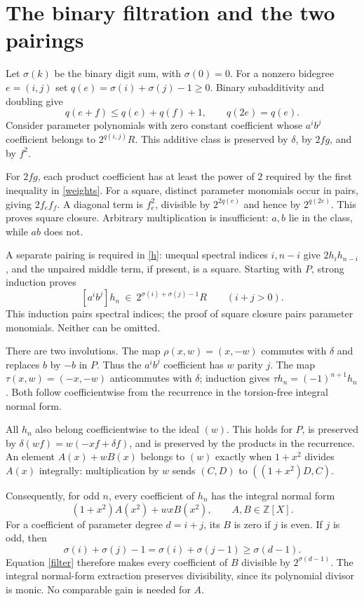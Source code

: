 \documentclass[11pt]{article}
\newcommand{\Z}{\mathbb Z}\newcommand{\Q}{\mathbb Q}
\newcommand{\sig}{\sigma}
\newcommand{\coef}[1]{\left[#1\right]}
\begin{document}
\newpage
\section{The binary filtration and the two pairings}
Let $\sig(k)$ be the binary digit sum, with $\sig(0)=0$. For a nonzero bidegree $e=(i,j)$ set $q(e)=\sig(i)+\sig(j)-1\ge0$. Binary subadditivity and doubling give
\begin{equation}\label{weights}
 q(e+f)\le q(e)+q(f)+1,\qquad q(2e)=q(e).
\end{equation}
Consider parameter polynomials with zero constant coefficient whose $a^ib^j$ coefficient belongs to $2^{q(i,j)}R$. This additive class is preserved by $\delta$, by $2fg$, and by $f^2$.

For $2fg$, each product coefficient has at least the power of $2$ required by the first inequality in \eqref{weights}. For a square, distinct parameter monomials occur in pairs, giving $2f_e f_f$. A diagonal term is $f_e^2$, divisible by $2^{2q(e)}$ and hence by $2^{q(2e)}$. This proves square closure. Arbitrary multiplication is insufficient: $a,b$ lie in the class, while $ab$ does not.

A separate pairing is required in \eqref{h}: unequal spectral indices $i,n-i$ give $2h_i h_{n-i}$, and the unpaired middle term, if present, is a square. Starting with $P$, strong induction proves
\begin{equation}\label{filter}
 \coef{a^ib^j}h_n\ \in\ 2^{\sig(i)+\sig(j)-1}R\qquad (i+j>0).
\end{equation}
This induction pairs spectral indices; the proof of square closure pairs parameter monomials. Neither can be omitted.

There are two involutions. The map $\rho(x,w)=(x,-w)$ commutes with $\delta$ and replaces $b$ by $-b$ in $P$. Thus the $a^ib^j$ coefficient has $w$ parity $j$. The map $\tau(x,w)=(-x,-w)$ anticommutes with $\delta$; induction gives $\tau h_n=(-1)^{n+1}h_n$. Both follow coefficientwise from the recurrence in the torsion-free integral normal form.

All $h_n$ also belong coefficientwise to the ideal $(w)$. This holds for $P$, is preserved by $\delta(wf)=w(-xf+\delta f)$, and is preserved by the products in the recurrence. An element $A(x)+wB(x)$ belongs to $(w)$ exactly when $1+x^2$ divides $A(x)$ integrally: multiplication by $w$ sends $(C,D)$ to $((1+x^2)D,C)$.

Consequently, for odd $n$, every coefficient of $h_n$ has the integral normal form
\begin{equation}\label{normal}
 (1+x^2)A(x^2)+wxB(x^2),\qquad A,B\in\Z[X].
\end{equation}
For a coefficient of parameter degree $d=i+j$, its $B$ is zero if $j$ is even. If $j$ is odd, then
\[
 \sig(i)+\sig(j)-1=\sig(i)+\sig(j-1)\ge\sig(d-1).
\]
Equation \eqref{filter} therefore makes every coefficient of $B$ divisible by $2^{\sig(d-1)}$. The integral normal-form extraction preserves divisibility, since its polynomial divisor is monic. No comparable gain is needed for $A$.
\end{document}
